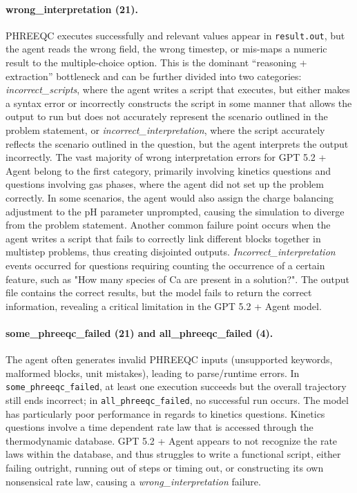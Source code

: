 \documentclass[sigconf,anonymous]{acmart}
\begin{document}
\paragraph{wrong\_interpretation (21).}
PHREEQC executes successfully and relevant values appear in \texttt{result.out}, but the agent reads the wrong field, the wrong timestep, or mis-maps a numeric result to the multiple-choice option. This is the dominant ``reasoning + extraction'' bottleneck and can be further divided into two categories: \textit{incorrect\_scripts}, where the agent writes a script that executes, but either makes a syntax error or incorrectly constructs the script in some manner that allows the output to run but does not accurately represent the scenario outlined in the problem statement, or \textit{incorrect\_interpretation}, where the script accurately reflects the scenario outlined in the question, but the agent interprets the output incorrectly. The vast majority of wrong interpretation errors for GPT 5.2 + Agent belong to the first category, primarily involving kinetics questions and questions involving gas phases, where the agent did not set up the problem correctly. In some scenarios, the agent would also assign the charge balancing adjustment to the pH parameter unprompted, causing the simulation to diverge from the problem statement. Another common failure point occurs when the agent writes a script that fails to correctly link different blocks together in multistep problems, thus creating disjointed outputs. \textit{Incorrect\_interpretation} events occurred for questions requiring counting the occurrence of a certain feature, such as "How many species of Ca are present in a solution?". The output file contains the correct results, but the model fails to return the correct information, revealing a critical limitation in the GPT 5.2 + Agent model. 

\paragraph{some\_phreeqc\_failed (21) and all\_phreeqc\_failed (4).}
The agent often generates invalid PHREEQC inputs (unsupported keywords, malformed blocks, unit mistakes), leading to parse/runtime errors. In \texttt{some\_phreeqc\_failed}, at least one execution succeeds but the overall trajectory still ends incorrect; in \texttt{all\_phreeqc\_failed}, no successful run occurs. The model has particularly poor performance in regards to kinetics questions. Kinetics questions involve a time dependent rate law that is accessed through the thermodynamic database. GPT 5.2 + Agent appears to not recognize the rate laws within the database, and thus struggles to write a functional script, either failing outright, running out of steps or timing out, or constructing its own nonsensical rate law, causing a \textit{wrong\_interpretation} failure. 
\end{document}
